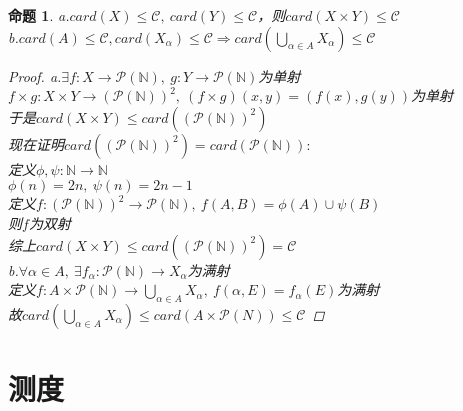 \documentclass[12pt, a4paper, oneside]{ctexbook}
\newtheorem{proposition}[theorem]{命题}
\begin{document}
\begin{proposition}
    a.$card(X)\leq\mathcal{C},\ card(Y)\leq\mathcal{C}$，则$card(X\times Y)\leq\mathcal{C}$\\
    b.$card(A)\leq\mathcal{C},card(X_{\alpha})\leq\mathcal{C}\Rightarrow card(\bigcup_{\alpha\in A}X_{\alpha})\leq\mathcal{C}$
    \begin{proof}
        a.$\exists f:X\rightarrow \mathcal{P}(\mathbb{N}),\ g:Y\rightarrow \mathcal{P}(\mathbb{N})$为单射\\
        $f\times g:X\times Y\rightarrow (\mathcal{P}(\mathbb{N}))^2,\ (f\times g)(x,y)=(f(x),g(y))$为单射\\
        于是$card(X\times Y)\leq card((\mathcal{P}(\mathbb{N}))^2)$\\
        现在证明$card((\mathcal{P}(\mathbb{N}))^2)=card(\mathcal{P}(\mathbb{N})):$\\
        定义$\phi,\psi :\mathbb{N}\rightarrow\mathbb{N}$\\
        $\phi(n)=2n,\ \psi(n)=2n-1$\\
        定义$f:(\mathcal{P}(\mathbb{N}))^2\rightarrow \mathcal{P}(\mathbb{N}),\ f(A,B)=\phi(A)\cup\psi(B)$\\
        则$f$为双射\\
        综上$card(X\times Y)\leq card((\mathcal{P}(\mathbb{N}))^2)=\mathcal{C}$\\[0.5cm]
        b.$\forall\alpha\in A,\ \exists f_{\alpha}:\mathcal{P}(\mathbb{N})\rightarrow X_{\alpha}$为满射\\
        定义$f:A\times\mathcal{P}(\mathbb{N})\rightarrow \bigcup_{\alpha\in A}X_{\alpha},\ f(\alpha,E)=f_{\alpha}(E)$为满射\\
        故$card(\bigcup_{\alpha\in A}X_{\alpha})\leq card(A\times\mathcal{P}(N))\leq\mathcal{C}$
    \end{proof}
\end{proposition}

\chapter{测度}
\end{document}
